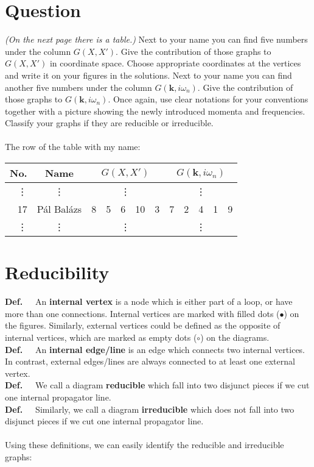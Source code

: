 \section*{Question}
\textit{(On the next page there is a table.)} Next to your name you can find five numbers under the column $G \left( X, X' \right)$. Give the contribution of those graphs to $G \left( X, X' \right)$ in coordinate space. Choose appropriate coordinates at the vertices and write it on your figures in the solutions. Next to your name you can find another five numbers under the column $G \left( \boldsymbol{k}, i \omega_{n} \right)$. Give the contribution of those graphs to $G \left( \boldsymbol{k}, i \omega_{n} \right)$. Once again, use clear notations for your conventions together with a picture showing the newly introduced momenta and frequencies. Classify your graphs if they are reducible or irreducible. \\ \\
The row of the table with my name:
\begin{center}
\begin{tabular}{|r|c|c|c|c|c|c||c|c|c|c|c|}
\hline
No.    & Name       & \multicolumn{5}{c||}{$G \left( X, X' \right)$} & \multicolumn{5}{c|}{$G \left( \boldsymbol{k}, i \omega_{n} \right)$} \\
\hline
\vdots & \vdots     & \multicolumn{5}{c||}{\vdots}                   & \multicolumn{5}{c|}{\vdots}        \\
\hline
17     & Pál Balázs &  8  &  5  &  6  &  10  &  3                    &  7  &  2  &  4  &  1  &  9         \\
\hline
\vdots & \vdots     & \multicolumn{5}{c||}{\vdots}                   & \multicolumn{5}{c|}{\vdots}        \\
\hline
\end{tabular}
\end{center}

\section*{Reducibility}
\textbf{Def.}\ \ \ An \textbf{internal vertex} is a node which is either part of a loop, or have more than one connections. Internal vertices are marked with filled dots ($\bullet$) on the figures. Similarly, external vertices could be defined as the opposite of internal vertices, which are marked as empty dots ($\circ$) on the diagrams. \\
\textbf{Def.}\ \ \ An \textbf{internal edge/line} is an edge which connects two internal vertices. In contrast, external edges/lines are always connected to at least one external vertex. \\
\textbf{Def.}\ \ \ We call a diagram \textbf{reducible} which fall into two disjunct pieces if we cut one internal propagator line. \\
\textbf{Def.}\ \ \ Similarly, we call a diagram \textbf{irreducible} which does not fall into two disjunct pieces if we cut one internal propagator line. \\ \\
Using these definitions, we can easily identify the reducible and irreducible graphs:

